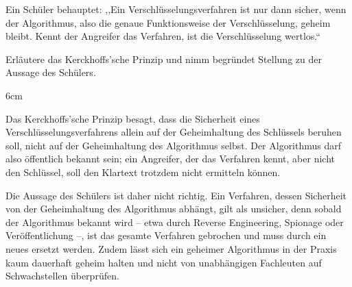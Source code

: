 \question[4]
Ein Schüler behauptet: ,,Ein Verschlüsselungsverfahren ist nur dann 
sicher, wenn der Algorithmus, also die genaue Funktionsweise der 
Verschlüsselung, geheim bleibt. Kennt der Angreifer das Verfahren, ist 
die Verschlüsselung wertlos.``

Erläutere das Kerckhoffs'sche Prinzip und nimm begründet Stellung zu 
der Aussage des Schülers.

\begin{solutionbox}{6cm}

Das Kerckhoffs'sche Prinzip besagt, dass die Sicherheit eines 
Verschlüsselungsverfahrens allein auf der Geheimhaltung des Schlüssels 
beruhen soll, nicht auf der Geheimhaltung des Algorithmus selbst. Der 
Algorithmus darf also öffentlich bekannt sein; ein Angreifer, der das 
Verfahren kennt, aber nicht den Schlüssel, soll den Klartext trotzdem 
nicht ermitteln können.

Die Aussage des Schülers ist daher nicht richtig. Ein Verfahren, dessen 
Sicherheit von der Geheimhaltung des Algorithmus abhängt, gilt als 
unsicher, denn sobald der Algorithmus bekannt wird -- etwa durch 
Reverse Engineering, Spionage oder Veröffentlichung --, ist das 
gesamte Verfahren gebrochen und muss durch ein neues ersetzt werden. 
Zudem lässt sich ein geheimer Algorithmus in der Praxis kaum dauerhaft 
geheim halten und nicht von unabhängigen Fachleuten auf Schwachstellen 
überprüfen. 

\end{solutionbox}


